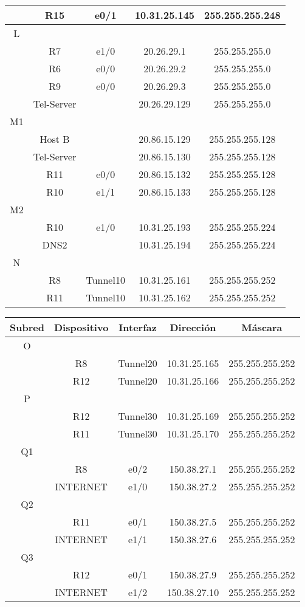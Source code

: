 \documentclass[12pt,a4paper,spanish]{article}
\begin{document}
\begin{tabular}{|c|c|c|c|c|}
	\hline
	  & R15 & e0/1 & 10.31.25.145 & 255.255.255.248 \\
	\hline
	\hline
	L & & & & \\
	\hline
	  & R7 & e1/0 & 20.26.29.1 & 255.255.255.0 \\
	\hline
	  & R6 & e0/0 & 20.26.29.2 & 255.255.255.0 \\
	\hline
	  & R9 & e0/0 & 20.26.29.3 & 255.255.255.0 \\
	\hline
	  & Tel-Server & & 20.26.29.129 & 255.255.255.0 \\
	\hline
	\hline
	M1 & & & & \\
	\hline
	  & Host B & & 20.86.15.129 & 255.255.255.128 \\
	\hline
	  & Tel-Server & & 20.86.15.130 & 255.255.255.128 \\
	\hline
	  & R11 & e0/0 & 20.86.15.132 & 255.255.255.128 \\
	\hline
	  & R10 & e1/1 & 20.86.15.133 & 255.255.255.128 \\
	\hline
	\hline
	M2 & & & & \\
	\hline
	  & R10 & e1/0 & 10.31.25.193 & 255.255.255.224 \\
	\hline
	  & DNS2 & & 10.31.25.194 & 255.255.255.224 \\
	\hline
	\hline
	N & & & & \\
	\hline
	  & R8 & Tunnel10 & 10.31.25.161 & 255.255.255.252 \\
	\hline
	  & R11 & Tunnel10 & 10.31.25.162 & 255.255.255.252 \\
	\hline
\end{tabular}
\newpage
\begin{tabular}{|c|c|c|c|c|}
	\hline
	Subred & Dispositivo & Interfaz & Dirección & Máscara\\
	\hline
	\hline
	O & & & & \\
	\hline
	  & R8 & Tunnel20 & 10.31.25.165 & 255.255.255.252 \\
	\hline
	  & R12 & Tunnel20 & 10.31.25.166 & 255.255.255.252 \\
	\hline
	\hline
	P & & & & \\
	\hline
	  & R12 & Tunnel30 & 10.31.25.169 & 255.255.255.252 \\
	\hline
	  & R11 & Tunnel30 & 10.31.25.170 & 255.255.255.252 \\
	\hline
	Q1 & & & & \\
	\hline
	  & R8 & e0/2 & 150.38.27.1 & 255.255.255.252 \\
	\hline
	  & INTERNET & e1/0 & 150.38.27.2 & 255.255.255.252 \\
	\hline
	Q2 & & & & \\
	\hline
	  & R11 & e0/1 & 150.38.27.5 & 255.255.255.252 \\
	\hline
	  & INTERNET & e1/1 & 150.38.27.6 & 255.255.255.252 \\
	\hline
	Q3 & & & & \\
	\hline
	  & R12 & e0/1 & 150.38.27.9 & 255.255.255.252 \\
	\hline
	  & INTERNET & e1/2 & 150.38.27.10 & 255.255.255.252 \\
	\hline
\end{tabular}
\end{document}
